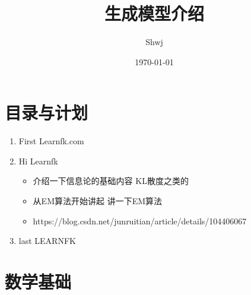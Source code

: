 \documentclass[12pt, a4paper, oneside]{ctexart}
\title{生成模型介绍}
\author{Shwj}
\date{\today}
\begin{document}

\maketitle

\section{目录与计划}

\begin{enumerate} 
    \item First Learnfk.com
    \item Hi Learnfk
        \begin{itemize}
            \item 介绍一下信息论的基础内容 KL散度之类的
            \item 从EM算法开始讲起 讲一下EM算法
            \item https://blog.csdn.net/junruitian/article/details/104406067
        \end{itemize}
    \item last LEARNFK
\end{enumerate}

\section{数学基础}
\end{document}
